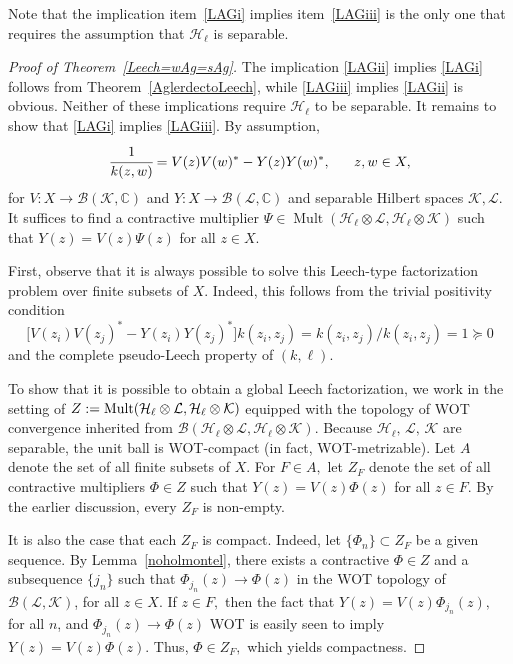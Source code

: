\documentclass[a4paper,reqno,index]{amsart}
\numberwithin{equation}{section}
\newcommand{\Mult}{\operatorname{Mult}}
\newcommand{\cH}{\mathcal{H}}
\newcommand{\opphi}[4]{{#1}\in \Mult({#3},{#4})}
\theoremstyle{definition}
\begin{document}
Note that the   implication item~\ref{LAGi} implies item~\ref{LAGiii} is the only one that
requires the assumption that $\cH_\ell$ is separable. 

\begin{proof}[Proof of Theorem~\ref{Leech=wAg=sAg}]
 The implication \ref{LAGii} implies \ref{LAGi} follows from Theorem~\ref{AglerdectoLeech}, while \ref{LAGiii} implies \ref{LAGii} is obvious. Neither of these implications require
 $\cH_\ell$ to be separable. It remains to show that \ref{LAGi} implies \ref{LAGiii}. By assumption,
\begin{equation*}
\cfrac{1}{k(z, w)}=V(z)V(w)^*-Y(z)Y(w)^*, \ \ \ \ \  z, w\in X, 
\end{equation*}
for  $V: X\to\mathcal{B}(\mathcal{K},\mathbb{C})$ and $Y:X\to\mathcal{B}(\mathcal{L},\mathbb{C})$ and  separable Hilbert spaces $\mathcal{K}, \mathcal{L}.$ It suffices to  find a contractive multiplier $\opphi{\Psi}{X}{\mathcal{H}_{\ell}\otimes\mathcal{L}}{ \mathcal{H}_{\ell}\otimes\mathcal{K}}$ such that $Y(z)=V(z)\Psi(z)$ for all $z\in X.$ 

First, observe that it is always possible to solve this Leech-type factorization problem over finite subsets of $X.$ Indeed, this follows from the trivial positivity condition
\[\big[V(z_i)V(z_j)^*-Y(z_i)Y(z_j)^*\big]k(z_i, z_j)=k(z_i, z_j)/k(z_i, z_j)=1\succeq 0 \]
and the complete pseudo-Leech property of $(k, \ell).$ 

To show that it is possible to obtain a global Leech factorization, 
we work in the setting of  $Z:=\textup{Mult}(\mathcal{H}_{\ell}\otimes\mathcal{L}, \mathcal{H}_{\ell}\otimes\mathcal{K})$ equipped with the topology of WOT convergence inherited from $\mathcal{B}(\mathcal{H}_{\ell}\otimes\mathcal{L}, \mathcal{H}_{\ell}\otimes\mathcal{K})$.  Because $\mathcal{H}_{\ell}, \,  \mathcal{L}, \,  \mathcal{K}$ are separable,  the unit ball is WOT-compact (in fact, WOT-metrizable).   
Let $A$ denote the set of all finite subsets of $X.$ For $F\in A,$ let $Z_F$ denote the set of all contractive multipliers $\Phi\in Z$ such that $Y(z)=V(z)\Phi(z)$ for all $z\in F.$ By the earlier discussion, every $Z_F$ is non-empty. 

It is also the case that each $Z_F$ is compact. Indeed, let $\{\Phi_n\}\subset Z_F$ be a given sequence. By Lemma~\ref{noholmontel}, there exists a contractive $\Phi\in Z$ and a subsequence $\{j_n\}$ such that  $\Phi_{j_n}(z)\to \Phi(z)$ in the WOT topology of $\mathcal{B}(\mathcal{L}, \mathcal{K})$, for all $z\in X.$
If $z\in F,$ then the fact that $Y(z)=V(z)\Phi_{j_n}(z),$ for all $n$, and $\Phi_{j_n}(z)\to\Phi(z)$ WOT is easily seen to imply $Y(z)=V(z)\Phi(z).$  Thus, $\Phi\in Z_F,$ which yields compactness.


\end{proof}
\end{document}
